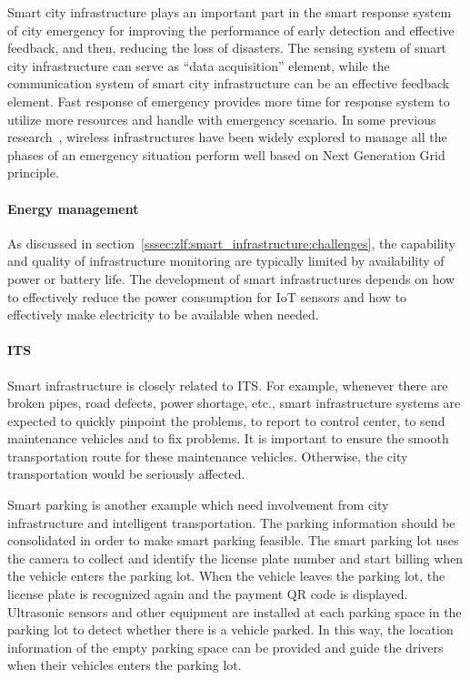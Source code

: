 \documentclass[letterpaper, twocolumn, 10pt, conference]{IEEEtran}
\begin{document}
Smart city infrastructure plays an important part in the smart response system of city emergency for improving the performance of early detection and effective feedback, and then, reducing the loss of disasters. The sensing system of smart city infrastructure can serve as \enquote{data acquisition} element, while the communication system of smart city infrastructure can be an effective feedback element. Fast response of emergency provides more time for response system to utilize more resources and handle with emergency scenario. In some previous research~\cite{fantacci2010novel}, wireless infrastructures have been widely explored to manage all the phases of an emergency situation perform well based on Next Generation Grid principle.


\paragraph{Energy management}

As discussed in section~\ref{sssec:zlf:smart_infrastructure:challenges}, the capability and quality of infrastructure monitoring are typically limited by availability of power or battery life. The development of smart infrastructures depends on how to effectively reduce the power consumption for IoT sensors and how to effectively make electricity to be available when needed. 

\paragraph{ITS}


Smart infrastructure is closely related to ITS. For example, whenever there are broken pipes, road defects, power shortage, etc., smart infrastructure systems are expected to quickly pinpoint the problems, to report to control center, to send maintenance vehicles and to fix problems. It is important to ensure the smooth transportation route for these maintenance  vehicles. Otherwise, the city transportation would be seriously affected. 


Smart parking is another example which need involvement from city infrastructure and intelligent transportation. The parking information should be consolidated in order to make smart parking feasible. The smart parking lot uses the camera to collect and identify the license plate number and start billing when the vehicle enters the parking lot. When the vehicle leaves the parking lot, the license plate is recognized again and the payment QR code is displayed. Ultrasonic sensors and other equipment are installed at each parking space in the parking lot to detect whether there is a vehicle parked. In this way, the location information of the empty parking space can be provided and guide the drivers when their vehicles enters the parking lot.
\end{document}
